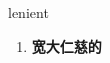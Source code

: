 
\begin{frame}
{\huge lenient}
\begin{center}
\begin{enumerate}\Large
  \item \textbf{宽大仁慈的}
\end{enumerate}
\end{center}
\end{frame}
